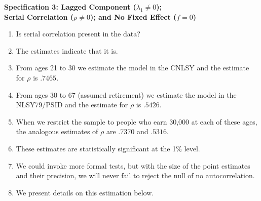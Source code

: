 \documentclass[static]{JJH-Beamer}
\begin{document}
\begin{frame}
 \addtocounter{framenumber}{-1}

\textbf{Specification 3: Lagged Component ($\lambda_{1} \neq 0$); \\Serial Correlation ($\rho \neq 0$); and No Fixed Effect ($f = 0$)}

\begin{enumerate}
\item Is serial correlation present in the data?
\item The estimates indicate that it is.
\item From ages 21 to 30 we estimate the model in the CNLSY and the estimate for $\rho$ is $.7465$.
\item From ages 30 to 67 (assumed retirement) we estimate the model in the NLSY79/PSID and the estimate for $\rho$ is $.5426$.
\item When we restrict the sample to people who earn 30,000 at each of these ages, the analogous estimates of $\rho$ are $.7370$ and $.5316$.
\item These estimates are statistically significant at the 1\% level.
\item We could invoke more formal tests, but with the size of the point estimates and their precision, we will never fail to reject the null of no autocorrelation.
\item We present details on this estimation below.
\end{enumerate}

\end{frame}
\end{document}
